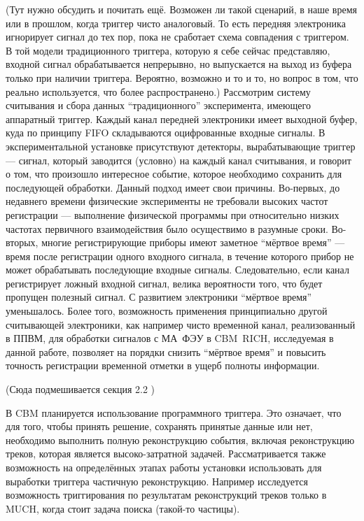 (Тут нужно обсудить и почитать ещё. Возможен ли такой сценарий, в наше время или в прошлом, когда триггер чисто аналоговый. То есть передняя электроника игнорирует сигнал до тех пор, пока не сработает схема совпадения с триггером. В той модели традиционного триггера, которую я себе сейчас представляю, входной сигнал обрабатывается непрерывно, но выпускается на выход из буфера только при наличии триггера. Вероятно, возможно и то и то, но вопрос в том, что реально используется, что более распространено.)
Рассмотрим систему считывания и сбора данных ``традиционного'' эксперимента, имеющего аппаратный триггер. Каждый канал передней электроники имеет выходной буфер, куда по принципу FIFO складываются оцифрованные входные сигналы. В экспериментальной установке присутствуют детекторы, вырабатывающие триггер --- сигнал, который заводится (условно) на каждый канал считывания, и говорит о том, что произошло интересное событие, которое необходимо сохранить для последующей обработки. Данный подход имеет свои причины. Во-первых, до недавнего времени физические эксперименты не требовали высоких частот регистрации --- выполнение физической программы при относительно низких частотах первичного взаимодействия было осуществимо в разумные сроки. Во-вторых, многие регистрирующие приборы имеют заметное ``мёртвое время'' --- время после регистрации одного входного сигнала, в течение которого прибор не может обрабатывать последующие входные сигналы. Следовательно, если канал регистрирует ложный входной сигнал, велика вероятности того, что будет пропущен полезный сигнал. С развитием электроники ``мёртвое время'' уменьшалось. Более того, возможность применения принципиально другой считывающей электроники, как например чисто временной канал, реализованный в ППВМ, для обработки сигналов с МА~ФЭУ в CBM~RICH, исследуемая в данной работе, позволяет на порядки снизить ``мёртвое время'' и повысить точность регистрации временной отметки в ущерб полноты информации.

(Сюда подмешивается секция 2.2 \todo)

В CBM планируется использование программного триггера. Это означает, что для того, чтобы принять решение, сохранять принятые данные или нет, необходимо выполнить полную реконструкцию события, включая реконструкцию треков, которая является высоко-затратной задачей. Рассматривается также возможность на определённых этапах работы установки использовать для выработки триггера частичную реконструкцию. Например исследуется возможность триггирования по результатам реконструкций треков только в MUCH, когда стоит задача поиска (\todo такой-то частицы).

